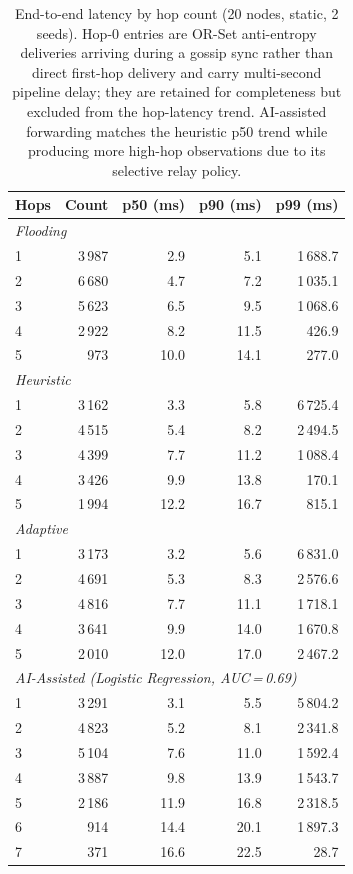 \documentclass[conference]{IEEEtran}
\begin{document}
\begin{table}[!t]
  \centering
  \caption{End-to-end latency by hop count (20 nodes, static, 2 seeds).
           Hop-0 entries are OR-Set anti-entropy deliveries arriving
           during a gossip sync rather than direct first-hop delivery
           and carry multi-second pipeline delay; they are retained for
           completeness but excluded from the hop-latency trend.
           AI-assisted forwarding matches the heuristic p50 trend while
           producing more high-hop observations due to its selective relay policy.}
  \label{tab:hop_latency}
  \setlength{\tabcolsep}{4pt}
  \begin{tabular}{lrrrr}
    \toprule
    \textbf{Hops} & \textbf{Count} & \textbf{p50 (ms)} & \textbf{p90 (ms)} & \textbf{p99 (ms)} \\
    \midrule
    \multicolumn{5}{l}{\textit{Flooding}} \\
    1 & 3\,987 & 2.9  & 5.1  & 1\,688.7 \\
    2 & 6\,680 & 4.7  & 7.2  & 1\,035.1 \\
    3 & 5\,623 & 6.5  & 9.5  & 1\,068.6 \\
    4 & 2\,922 & 8.2  & 11.5 & 426.9    \\
    5 & 973   & 10.0 & 14.1 & 277.0    \\
    \midrule
    \multicolumn{5}{l}{\textit{Heuristic}} \\
    1 & 3\,162 & 3.3  & 5.8  & 6\,725.4 \\
    2 & 4\,515 & 5.4  & 8.2  & 2\,494.5 \\
    3 & 4\,399 & 7.7  & 11.2 & 1\,088.4 \\
    4 & 3\,426 & 9.9  & 13.8 & 170.1    \\
    5 & 1\,994 & 12.2 & 16.7 & 815.1    \\
    \midrule
    \multicolumn{5}{l}{\textit{Adaptive}} \\
    1 & 3\,173 & 3.2  & 5.6  & 6\,831.0 \\
    2 & 4\,691 & 5.3  & 8.3  & 2\,576.6 \\
    3 & 4\,816 & 7.7  & 11.1 & 1\,718.1 \\
    4 & 3\,641 & 9.9  & 14.0 & 1\,670.8 \\
    5 & 2\,010 & 12.0 & 17.0 & 2\,467.2 \\
    \midrule
    \multicolumn{5}{l}{\textit{AI-Assisted (Logistic Regression, AUC\,=\,0.69)}} \\
    1 & 3\,291 & 3.1  & 5.5  & 5\,804.2 \\
    2 & 4\,823 & 5.2  & 8.1  & 2\,341.8 \\
    3 & 5\,104 & 7.6  & 11.0 & 1\,592.4 \\
    4 & 3\,887 & 9.8  & 13.9 & 1\,543.7 \\
    5 & 2\,186 & 11.9 & 16.8 & 2\,318.5 \\
    6 &   914  & 14.4 & 20.1 & 1\,897.3 \\
    7 &   371  & 16.6 & 22.5 &    28.7  \\
    \bottomrule
  \end{tabular}
\end{table}
\end{document}

